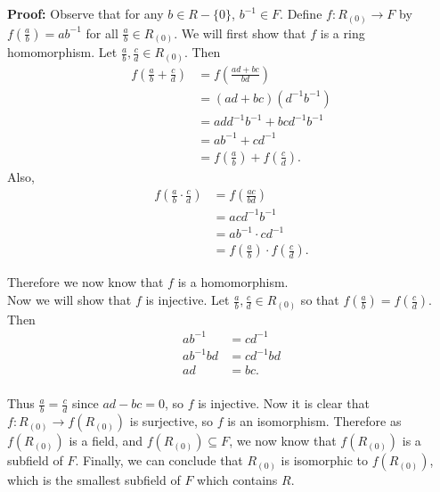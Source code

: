 \documentclass{article}
\newcommand\Proof{%
	\textbf{Proof:} %
}
\begin{document}
\begin{enumerate}
\Proof Observe that for any $b \in R-\{0\}$, $b^{-1} \in F$. Define $f:R_{(0)} \to F$ by $f(\frac{a}{b})=ab^{-1}$ for all $\frac{a}{b} \in R_{(0)}$. We will first show that $f$ is a ring homomorphism. Let $\frac{a}{b},\frac{c}{d} \in R_{(0)}$. Then
\[
	\begin{split}
		f \left(\frac{a}{b} + \frac{c}{d}\right) &= f \left(\frac{ad+bc}{bd} \right)\\
									&=(ad+bc)(d^{-1}b^{-1})\\
									&=add^{-1}b^{-1}+bcd^{-1}b^{-1}\\
									&=ab^{-1}+cd^{-1}\\
									&=f \left( \frac{a}{b} \right) + f \left( \frac{c}{d} \right).
	\end{split}
\]
Also, 
\[
	\begin{split}
		f \left(\frac{a}{b} \cdot \frac{c}{d} \right) &= f \left(\frac{ac}{bd} \right)\\
											&= acd^{-1}b^{-1}\\
											&= ab^{-1} \cdot cd^{-1}\\
											&= f \left( \frac{a}{b} \right) \cdot f \left( \frac{c}{d} \right).
	\end{split}
\]

Therefore we now know that $f$ is a homomorphism.\\

Now we will show that $f$ is injective. Let $\frac{a}{b}, \frac{c}{d} \in R_{(0)}$ so that $f \left( \frac{a}{b} \right) = f \left( \frac{c}{d} \right)$. Then
\[
	\begin{split}
		ab^{-1}&=cd^{-1}\\
		ab^{-1}bd&=cd^{-1}bd\\
				ad&=bc.\\
	\end{split}
\]

Thus $\frac{a}{b}=\frac{c}{d}$ since $ad-bc=0$, so $f$ is injective. Now it is clear that $f:R_{(0)} \to f (R_{(0)})$ is surjective, so $f$ is an isomorphism. Therefore as $f(R_{(0)})$ is a field, and $f(R_{(0)}) \subseteq F$, we now know that $f(R_{(0)})$ is a subfield of $F$. Finally, we can conclude that $R_{(0)}$ is isomorphic to $f(R_{(0)})$, which is the smallest subfield of $F$ which contains $R$.
 
\end{enumerate}
\end{document}
